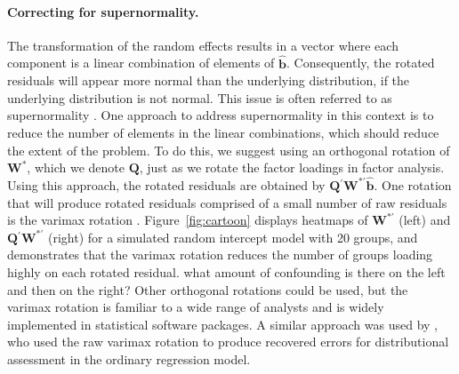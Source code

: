 \documentclass[12pt]{article} %
\newcommand{\hh}[1]{{\color{orange} #1}}
\newcommand{\trans}{\ensuremath{^\prime}}
\begin{document}
\paragraph{Correcting for supernormality.}
The transformation of the random effects results in a vector where each component is a linear combination of elements of $\widehat{\bm{b}}$. Consequently, the rotated residuals will appear more normal than the underlying distribution, if the underlying distribution is not normal. This issue is often referred to as supernormality \citep{Atkinson:1985}. One approach to address supernormality in this context is to reduce the number of elements in the linear combinations, which should reduce the extent of the problem. To do this, we suggest using an orthogonal rotation of $\bm{W}^*$, which we denote $\bm{Q}$, just as we rotate the factor loadings in factor analysis. Using this approach, the rotated residuals are obtained by $\bm{Q}\trans \bm{W}^{*\prime} \widehat{\bm{b}}$. One rotation that will produce rotated residuals comprised of a small number of raw residuals is the varimax rotation \citep{Johnson:2007}. Figure~\ref{fig:cartoon} displays heatmaps of $\bm{W}^{*\prime}$ (left) and $\bm{Q}\trans\bm{W}^{*\prime}$ (right) for a simulated random intercept model with 20 groups, and demonstrates that the varimax rotation reduces the number of groups loading highly on each rotated residual. \hh{what amount of confounding is there on the left and then on the right?} Other orthogonal rotations could be used, but the varimax rotation is familiar to a wide range of analysts and is widely implemented in statistical software packages. A similar approach was used by \cite{Jensen:1999iu}, who used the raw varimax rotation to produce recovered errors for distributional assessment in the ordinary regression model.
\end{document}
